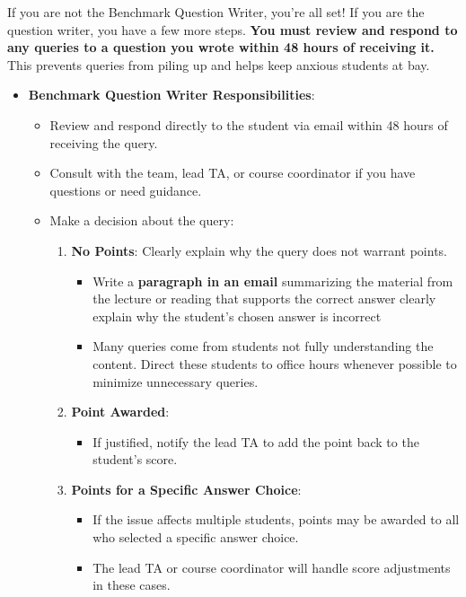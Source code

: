 \documentclass[
]{article}
\providecommand{\tightlist}{%
  \setlength{\itemsep}{0pt}\setlength{\parskip}{0pt}}
\begin{document}
If you are not the Benchmark Question Writer, you're all set! If you are the question writer, you have a few more steps. \textbf{You must review and respond to any queries to a question you wrote within 48 hours of receiving it.} This prevents queries from piling up and helps keep anxious students at bay.

\begin{itemize}
\tightlist
\item
  \textbf{Benchmark Question Writer Responsibilities}:

  \begin{itemize}
  \tightlist
  \item
    Review and respond directly to the student via email within 48 hours of receiving the query.\\
  \item
    Consult with the team, lead TA, or course coordinator if you have questions or need guidance.\\
  \item
    Make a decision about the query:

    \begin{enumerate}
    \def\labelenumi{\arabic{enumi}.}
    \tightlist
    \item
      \textbf{No Points}: Clearly explain why the query does not warrant points.

      \begin{itemize}
      \tightlist
      \item
        Write a \textbf{paragraph in an email} summarizing the material from the lecture or reading that supports the correct answer clearly explain why the student's chosen answer is incorrect
      \item
        Many queries come from students not fully understanding the content. Direct these students to office hours whenever possible to minimize unnecessary queries.\\
      \end{itemize}
    \item
      \textbf{Point Awarded}:

      \begin{itemize}
      \tightlist
      \item
        If justified, notify the lead TA to add the point back to the student's score.\\
      \end{itemize}
    \item
      \textbf{Points for a Specific Answer Choice}:

      \begin{itemize}
      \tightlist
      \item
        If the issue affects multiple students, points may be awarded to all who selected a specific answer choice.\\
      \item
        The lead TA or course coordinator will handle score adjustments in these cases.
      \end{itemize}
    \end{enumerate}
  \end{itemize}
\end{itemize}
\end{document}
